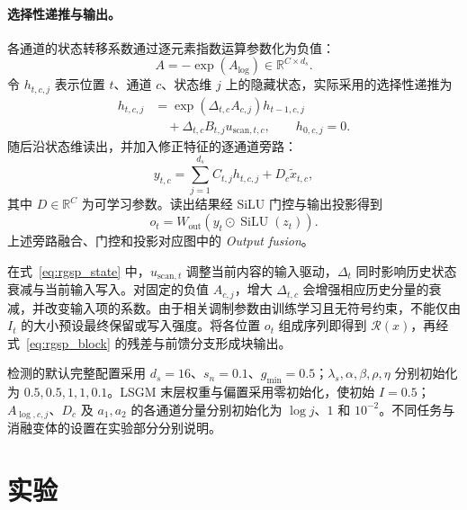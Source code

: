 \documentclass[journal]{IEEEtran}
\begin{document}
\paragraph{选择性递推与输出。}
各通道的状态转移系数通过逐元素指数运算参数化为负值：
\begin{equation}
A=-\exp(A_{\log})
\in\mathbb{R}^{C\times d_s}.
\label{eq:state_matrix}
\end{equation}
令 $h_{t,c,j}$ 表示位置 $t$、通道 $c$、状态维 $j$ 上的隐藏状态，实际采用的选择性递推为
\begin{equation}
\begin{aligned}
h_{t,c,j}
&=\exp\!\left(\Delta_{t,c}A_{c,j}\right)h_{t-1,c,j}\\
&\quad+\Delta_{t,c}B_{t,j}u_{\mathrm{scan},t,c},
\qquad h_{0,c,j}=0.
\end{aligned}
\label{eq:rgsp_state}
\end{equation}
随后沿状态维读出，并加入修正特征的逐通道旁路：
\begin{equation}
y_{t,c}
=\sum_{j=1}^{d_s}C_{t,j}h_{t,c,j}
+D_c\tilde{x}_{t,c},
\label{eq:ssm_readout}
\end{equation}
其中 $D\in\mathbb{R}^{C}$ 为可学习参数。读出结果经 SiLU 门控与输出投影得到
\begin{equation}
o_t=W_{\mathrm{out}}\!\left(
y_t\odot\operatorname{SiLU}(z_t)
\right).
\label{eq:rgsp_output}
\end{equation}
上述旁路融合、门控和投影对应图中的 \emph{Output fusion}。

在式~\eqref{eq:rgsp_state} 中，$u_{\mathrm{scan},t}$ 调整当前内容的输入驱动，$\Delta_t$ 同时影响历史状态衰减与当前输入写入。对固定的负值 $A_{c,j}$，增大 $\Delta_{t,c}$ 会增强相应历史分量的衰减，并改变输入项的系数。由于相关调制参数由训练学习且无符号约束，不能仅由 $I_t$ 的大小预设最终保留或写入强度。将各位置 $o_t$ 组成序列即得到 $\mathcal{R}(x)$，再经式~\eqref{eq:rgsp_block} 的残差与前馈分支形成块输出。

检测的默认完整配置采用 $d_s=16$、$s_n=0.1$、$g_{\min}=0.5$；$\lambda_s,\alpha,\beta,\rho,\eta$ 分别初始化为 $0.5,0.5,1,1,0.1$。LSGM 末层权重与偏置采用零初始化，使初始 $I=0.5$；$A_{\log,c,j}$、$D_c$ 及 $a_1,a_2$ 的各通道分量分别初始化为 $\log j$、$1$ 和 $10^{-2}$。不同任务与消融变体的设置在实验部分分别说明。

\FloatBarrier
\section{实验}
\label{sec:experiments}
\end{document}

